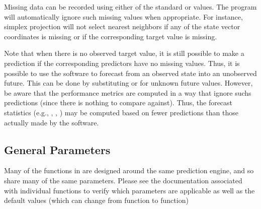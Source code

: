 \documentclass[article]{jss}
\begin{document}
Missing data can be recorded using either of the standard  or  values. The program will automatically ignore such missing values when appropriate. For instance, simplex projection will not select nearest neighbors if any of the state vector coordinates is missing or if the corresponding target value is missing.

Note that when there is no observed target value, it is still possible to make a prediction if the corresponding predictors have no missing values. Thus, it is possible to use the software to forecast from an observed state into an unobserved future. This can be done by substituting  or  for unknown future values. However, be aware that the performance metrics are computed in a way that ignore suchs predictions (since there is nothing to compare against). Thus, the forecast statistics (e.g., , , ) may be computed based on fewer predictions than those actually made by the software.

\subsection{General Parameters}\label{sec:general-parameters}

Many of the functions in  are designed around the same prediction engine, and so share many of the same parameters. Please see the documentation associated with individual functions to verify which parameters are applicable as well as the default values (which can change from function to function)
\end{document}
